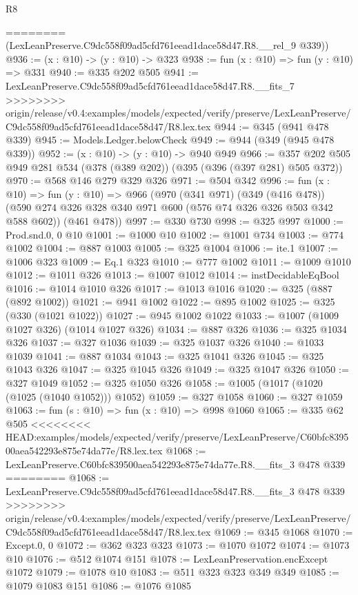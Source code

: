 \begin{lexlean}{R8}
\begin{coremodule}
{{{{{{{{{{{{{{{{{{{{{{{========
      (LexLeanPreserve.C9dc558f09ad5cfd761eead1dace58d47.R8.__rel_9 @339))
@936 := (x : @10) -> (y : @10) -> @323
@938 := fun (x : @10) => fun (y : @10) => @331
@940 := @335 @202 @505
@941 := LexLeanPreserve.C9dc558f09ad5cfd761eead1dace58d47.R8.__fits_7
>>>>>>>> origin/release/v0.4:examples/models/expected/verify/preserve/LexLeanPreserve/C9dc558f09ad5cfd761eead1dace58d47/R8.lex.tex
@944 := @345 (@941 @478 @339)
@945 := Models.Ledger.belowCheck
@949 := @944 (@349 (@945 @478 @339))
@952 := (x : @10) -> (y : @10) -> @940 @949
@966 := @357 @202 @505 @949 @281 @534 (@378 (@389 @202)) (@395 (@396 (@397 @281) @505 @372))
@970 := @568 @146 @279 @329 @326
@971 := @504 @342
@996 := fun (x : @10) =>
  fun (y : @10) =>
  @966
    (@970
      (@341 @971)
      (@349 (@416 @478))
      (@590 @274 @326 @328 @340 @971 @600 (@576 @74 @326 @326 @503 @342 @588 @602))
      (@461 @478))
@997 := @330 @730
@998 := @325 @997
@1000 := Prod.snd.{0, 0} @10
@1001 := @1000 @10
@1002 := @1001 @734
@1003 := @774 @1002
@1004 := @887 @1003
@1005 := @325 @1004
@1006 := ite.{1}
@1007 := @1006 @323
@1009 := Eq.{1} @323
@1010 := @777 @1002
@1011 := @1009 @1010
@1012 := @1011 @326
@1013 := @1007 @1012
@1014 := instDecidableEqBool
@1016 := @1014 @1010 @326
@1017 := @1013 @1016
@1020 := @325 (@887 (@892 @1002))
@1021 := @941 @1002
@1022 := @895 @1002
@1025 := @325 (@330 (@1021 @1022))
@1027 := @945 @1002 @1022
@1033 := @1007 (@1009 @1027 @326) (@1014 @1027 @326)
@1034 := @887 @326
@1036 := @325 @1034 @326
@1037 := @327 @1036
@1039 := @325 @1037 @326
@1040 := @1033 @1039
@1041 := @887 @1034
@1043 := @325 @1041 @326
@1045 := @325 @1043 @326
@1047 := @325 @1045 @326
@1049 := @325 @1047 @326
@1050 := @327 @1049
@1052 := @325 @1050 @326
@1058 := @1005 (@1017 (@1020 (@1025 (@1040 @1052))) @1052)
@1059 := @327 @1058
@1060 := @327 @1059
@1063 := fun (s : @10) => fun (x : @10) => @998 @1060
@1065 := @335 @62 @505
<<<<<<<< HEAD:examples/models/expected/verify/preserve/LexLeanPreserve/C60bfc839500aea542293e875e74da77e/R8.lex.tex
@1068 := LexLeanPreserve.C60bfc839500aea542293e875e74da77e.R8.__fits_3 @478 @339
========
@1068 := LexLeanPreserve.C9dc558f09ad5cfd761eead1dace58d47.R8.__fits_3 @478 @339
>>>>>>>> origin/release/v0.4:examples/models/expected/verify/preserve/LexLeanPreserve/C9dc558f09ad5cfd761eead1dace58d47/R8.lex.tex
@1069 := @345 @1068
@1070 := Except.{0, 0}
@1072 := @362 @323 @323
@1073 := @1070 @1072
@1074 := @1073 @10
@1076 := @512 @1074 @151
@1078 := LexLeanPreservation.encExcept @1072
@1079 := @1078 @10
@1083 := @511 @323 @323 @349 @349
@1085 := @1079 @1083 @151
@1086 := @1076 @1085
}}}}}}}}}}}}}}}}}}}}}}}
\end{coremodule}
\end{lexlean}
